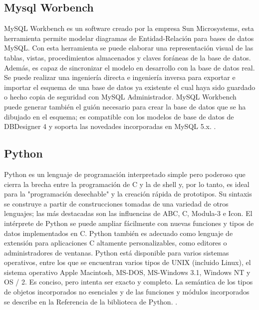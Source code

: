 \subsection{Mysql Worbench}
MySQL Workbench es un software creado por la empresa Sun Microsystems, esta herramienta permite modelar diagramas de Entidad-Relación para bases de datos MySQL. Con esta herramienta se puede elaborar una representación visual de las tablas, vistas, procedimientos almacenados y claves foráneas de la base de datos. Además, es capaz de sincronizar el modelo en desarrollo con la base de datos real. Se puede realizar una ingeniería directa e ingeniería inversa para exportar e importar el esquema de una base de datos ya existente el cual haya sido guardado o hecho copia de seguridad con MySQL Administrador. MySQL Workbench puede generar también el guión necesario para crear la base de datos que se ha dibujado en el esquema; es compatible con los modelos de base de datos de DBDesigner 4 y soporta las novedades incorporadas en MySQL 5.x. \citep{MySQLWorkbench}.
\subsection{Python}
Python es un lenguaje de programación interpretado simple pero poderoso que cierra la brecha entre la programación de C y la de shell y, por lo tanto, es ideal para la "programación desechable" y la creación rápida de prototipos. Su sintaxis se construye a partir de construcciones tomadas de una variedad de otros lenguajes; las más destacadas son las influencias de ABC, C, Modula-3 e Icon. El intérprete de Python se puede ampliar fácilmente con nuevas funciones y tipos de datos implementados en C. Python también es adecuado como lenguaje de extensión para aplicaciones C altamente personalizables, como editores o administradores de ventanas. Python está disponible para varios sistemas operativos, entre los que se encuentran varios tipos de UNIX (incluido Linux), el sistema operativo Apple Macintosh, MS-DOS, MS-Windows 3.1, Windows NT y OS / 2. Es conciso, pero intenta ser exacto y completo. La semántica de los tipos de objetos incorporados no esenciales y de las funciones y módulos incorporados se describe en la Referencia de la biblioteca de Python. \citep{rossum1995python}.

